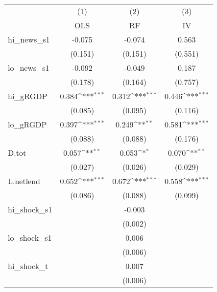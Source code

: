 {
\def\sym#1{\ifmmode^{#1}\else\(^{#1}\)\fi}
\begin{tabular}{l*{3}{c}}
\toprule
            &\multicolumn{1}{c}{(1)}&\multicolumn{1}{c}{(2)}&\multicolumn{1}{c}{(3)}\\
            &\multicolumn{1}{c}{OLS}&\multicolumn{1}{c}{RF}&\multicolumn{1}{c}{IV}\\
\midrule
hi\_news\_s1  &      -0.075         &      -0.074         &       0.563         \\
            &     (0.151)         &     (0.151)         &     (0.551)         \\
\addlinespace
lo\_news\_s1  &      -0.092         &      -0.049         &       0.187         \\
            &     (0.178)         &     (0.164)         &     (0.757)         \\
\addlinespace
hi\_gRGDP    &       0.384\sym{***}&       0.312\sym{***}&       0.446\sym{***}\\
            &     (0.085)         &     (0.095)         &     (0.116)         \\
\addlinespace
lo\_gRGDP    &       0.397\sym{***}&       0.249\sym{**} &       0.581\sym{***}\\
            &     (0.088)         &     (0.088)         &     (0.176)         \\
\addlinespace
D.tot       &       0.057\sym{**} &       0.053\sym{*}  &       0.070\sym{**} \\
            &     (0.027)         &     (0.026)         &     (0.029)         \\
\addlinespace
L.netlend   &       0.652\sym{***}&       0.672\sym{***}&       0.558\sym{***}\\
            &     (0.086)         &     (0.088)         &     (0.099)         \\
\addlinespace
hi\_shock\_s1 &                     &      -0.003         &                     \\
            &                     &     (0.002)         &                     \\
\addlinespace
lo\_shock\_s1 &                     &       0.006         &                     \\
            &                     &     (0.006)         &                     \\
\addlinespace
hi\_shock\_t  &                     &       0.007         &                     \\
            &                     &     (0.006)         &                     \\

\end{tabular}}
